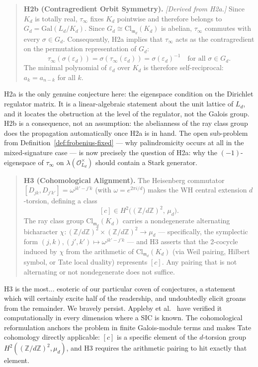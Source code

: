 \documentclass[12pt]{article}
\theoremstyle{plain}
\theoremstyle{definition}
\theoremstyle{remark}
\newcommand{\OO}{\mathcal{O}}
\newcommand{\eps}{\varepsilon}
\newcommand{\bZ}{\mathbb{Z}}
\begin{document}
\begin{quote}
\textbf{H2b (Contragredient Orbit Symmetry).} \emph{[Derived from H2a.]} Since $K_d$ is totally real, $\tau_\infty$ fixes $K_d$ pointwise and therefore belongs to $G_d = \mathrm{Gal}(L_d/K_d)$. Since $G_d \cong \mathrm{Cl}_{\mathfrak{m}_d}(K_d)$ is abelian, $\tau_\infty$ commutes with every $\sigma \in G_d$. Consequently, H2a implies that $\tau_\infty$ acts as the contragredient on the permutation representation of $G_d$:
\[
  \tau_\infty(\sigma(\eps_d)) = \sigma(\tau_\infty(\eps_d)) = \sigma(\eps_d)^{-1} \quad \text{for all } \sigma \in G_d.
\]
The minimal polynomial of $\eps_d$ over $K_d$ is therefore self-reciprocal: $a_k = a_{n-k}$ for all $k$.
\end{quote}

H2a is the only genuine conjecture here: the eigenspace condition on the Dirichlet regulator matrix. It is a linear-algebraic statement about the unit lattice of $L_d$, and it locates the obstruction at the level of the regulator, not the Galois group. H2b is a consequence, not an assumption: the abelianness of the ray class group does the propagation automatically once H2a is in hand. The open sub-problem from Definition~\ref{def:frobenius-fixed} — why palindromicity occurs at all in the mixed-signature case — is now precisely the question of H2a: why the $(-1)$-eigenspace of $\tau_\infty$ on $\lambda(\OO_{L_d}^\times)$ should contain a Stark generator.

\begin{quote}
\textbf{H3 (Cohomological Alignment).} The Heisenberg commutator $[D_{jk}, D_{j'k'}] = \omega^{jk'-j'k}$ (with $\omega = e^{2\pi i/d}$) makes the WH central extension $d$-torsion, defining a class
\[
  [c] \in H^2\!\bigl((\bZ/d\bZ)^2,\, \mu_d\bigr).
\]
The ray class group $\mathrm{Cl}_{\mathfrak{m}_d}(K_d)$ carries a nondegenerate alternating bicharacter $\chi: (\bZ/d\bZ)^2 \times (\bZ/d\bZ)^2 \to \mu_d$ — specifically, the symplectic form $(j,k),(j',k') \mapsto \omega^{jk'-j'k}$ — and H3 asserts that the 2-cocycle induced by $\chi$ from the arithmetic of $\mathrm{Cl}_{\mathfrak{m}_d}(K_d)$ (via Weil pairing, Hilbert symbol, or Tate local duality) represents $[c]$. Any pairing that is not alternating or not nondegenerate does not suffice.
\end{quote}

H3 is the most... esoteric of our particular coven of conjectures, a statement which will certainly excite half of the readership, and undoubtedly elicit groans from the remainder. We bravely persist. Appleby et al.\ \cite{afmy2017} have verified it computationally in every dimension where a SIC is known. The cohomological reformulation anchors the problem in finite Galois-module terms and makes Tate cohomology directly applicable: $[c]$ is a specific element of the $d$-torsion group $H^2((\bZ/d\bZ)^2, \mu_d)$, and H3 requires the arithmetic pairing to hit exactly that element.
\end{document}
